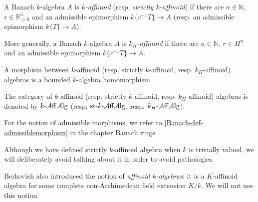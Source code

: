 \begin{definition}
    A Banach $k$-algebra $A$ is \emph{$k$-affinoid} (resp. \emph{strictly $k$-affinoid}) if there are $n\in \mathbb{N}$, $r\in \mathbb{R}^n_{>0}$ and an admissible epimorphism $k\{r^{-1}T\}\rightarrow A$ (resp. an admissible epimorphism $k\{T\}\rightarrow A$).


    More generally, a Banach $k$-algebra $A$ is \emph{$k_H$-affinoid} if there are $n\in \mathbb{N}$, $r\in H^n$  and an admissible epimorphism $k\{r^{-1}T\}\rightarrow A$.

    A morphism between $k$-affinoid (resp. strictly $k$-affinoid, resp. $k_H$-affinoid) algebras is a bounded $k$-algebra homomorphism.

    The category of $k$-affinoid (resp. strictly $k$-affinoid, resp. $k_H$-affinoid) algebras is denoted by $k\text{-}\mathcal{A}\mathrm{ff}\mathcal{A}\mathrm{lg}$ (resp. $\text{st-}k\text{-}\mathcal{A}\mathrm{ff}\mathcal{A}\mathrm{lg}$, resp. $k_H\text{-}\mathcal{A}\mathrm{ff}\mathcal{A}\mathrm{lg}$). 
    
    

\end{definition}
For the notion of admissible morphisms, we refer to \cref{Banach-def-admissiblemorphism} in the chapter Banach rings.

Although we have defined strictly $k$-affinoid algebra when $k$ is trivially valued, we will deliberately avoid talking about it in order to avoid pathologies.
\begin{remark}
    Berkovich also introduced the notion of \emph{affinoid $k$-algebras}: it is a $K$-affinoid algebra for some complete non-Archimedean field extension $K/k$. We will not use this notion.
\end{remark}


